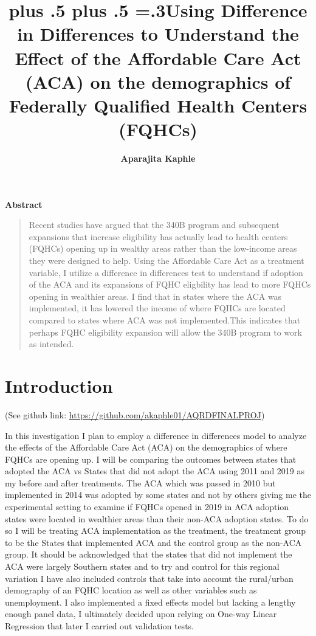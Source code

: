 \documentclass[12pt, ]{article}
\title{\sffamily\bfseries\huge\parfillskip=0pt
\rightskip=0pt plus .5\textwidth
\leftskip=0pt plus .5\textwidth
\emergencystretch=.3\textwidth Using Difference in Differences to
Understand the Effect of the Affordable Care Act (ACA) on the
demographics of Federally Qualified Health Centers (FQHCs)}
\author{\textbf{Aparajita Kaphle}
 }
\date{}
\renewenvironment{abstract}{
  \centerline
  {\large\sffamily\bfseries Abstract}\vspace{-1em}
  \begin{quote}\small
}{
  \end{quote}
}
\begin{document}
\allsectionsfont{\sffamily}

\maketitle

\begin{abstract}
Recent studies have argued that the 340B program and subsequent
expansions that increase eligibility has actually lead to health centers
(FQHCs) opening up in wealthy areas rather than the low-income areas
they were designed to help. Using the Affordable Care Act as a treatment
variable, I utilize a difference in differences test to understand if
adoption of the ACA and its expansions of FQHC eligbility has lead to
more FQHCs opening in wealthier areas. I find that in states where the
ACA was implemented, it has lowered the income of where FQHCs are
located compared to states where ACA was not implemented.This indicates
that perhaps FQHC eligibility expansion will allow the 340B program to
work as intended.
\end{abstract}

\ifdefined\Shaded\renewenvironment{Shaded}{\begin{tcolorbox}[borderline west={3pt}{0pt}{shadecolor}, interior hidden, boxrule=0pt, enhanced, sharp corners, breakable, frame hidden]}{\end{tcolorbox}}\fi




\hypertarget{introduction}{%
\section{Introduction}\label{introduction}}

(See github link: \url{https://github.com/akaphle01/AQRDFINALPROJ})

In this investigation I plan to employ a difference in differences model
to analyze the effects of the Affordable Care Act (ACA) on the
demographics of where FQHCs are opening up. I will be comparing the
outcomes between states that adopted the ACA vs States that did not
adopt the ACA using 2011 and 2019 as my before and after treatments. The
ACA which was passed in 2010 but implemented in 2014 was adopted by some
states and not by others giving me the experimental setting to examine
if FQHCs opened in 2019 in ACA adoption states were located in wealthier
areas than their non-ACA adoption states. To do so I will be treating
ACA implementation as the treatment, the treatment group to be the
States that implemented ACA and the control group as the non-ACA group.
It should be acknowledged that the states that did not implement the ACA
were largely Southern states and to try and control for this regional
variation I have also included controls that take into account the
rural/urban demography of an FQHC location as well as other variables
such as unemployment. I also implemented a fixed effects model but
lacking a lengthy enough panel data, I ultimately decided upon relying
on One-way Linear Regression that later I carried out validation tests.
\end{document}
